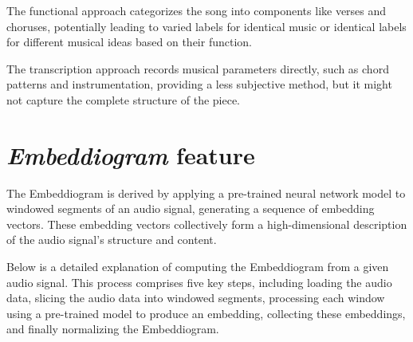 The functional approach categorizes the song into components like verses and choruses, potentially leading to varied labels for identical music or identical labels for different musical ideas based on their function. 

The transcription approach records musical parameters directly, such as chord patterns and instrumentation, providing a less subjective method, but it might not capture the complete structure of the piece.

\section{\textit{Embeddiogram} feature}

The Embeddiogram is derived by applying a pre-trained neural network model to windowed segments of an audio signal, generating a sequence of embedding vectors. These embedding vectors collectively form a high-dimensional description of the audio signal's structure and content.

Below is a detailed explanation of computing the Embeddiogram from a given audio signal. This process comprises five key steps, including loading the audio data, slicing the audio data into windowed segments, processing each window using a pre-trained model to produce an embedding, collecting these embeddings, and finally normalizing the Embeddiogram. 

